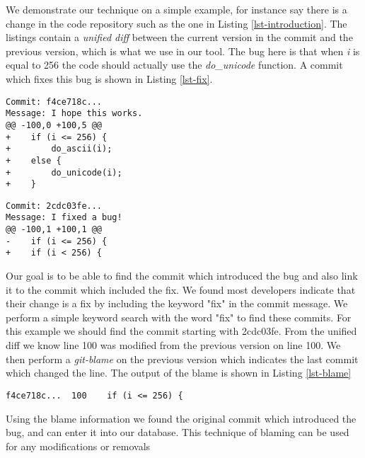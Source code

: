 


We demonstrate our technique on a simple example, for instance say
there is a change in the code repository such as the one in Listing
\ref{lst-introduction}. The listings contain a {\em unified diff}
between the current version in the commit and the previous version,
which is what we use in our tool. The bug here is that when {\em i} is
equal to 256 the code should actually use the {\em do\_unicode}
function. A commit which fixes this bug is shown in Listing \ref{lst-fix}.


\begin{lstlisting}[caption=An example bug introduction,label=lst-introduction, frame=single]
Commit: f4ce718c...
Message: I hope this works.
@@ -100,0 +100,5 @@
+    if (i <= 256) {
+        do_ascii(i);
+    else {
+        do_unicode(i);
+    }
\end{lstlisting}

\begin{lstlisting}[caption=An example bug fix,label=lst-fix,frame=single]
Commit: 2cdc03fe...
Message: I fixed a bug!
@@ -100,1 +100,1 @@
-    if (i <= 256) {
+    if (i < 256) {
\end{lstlisting}

Our goal is to be able to find the commit which introduced the bug and
also link it to the commit which included the fix. We found most
developers indicate that their change is a fix by including the keyword "fix"
in the commit message. We perform a simple keyword search with the word "fix"
to find these commits. For this example we should find the commit
starting with 2cdc03fe. From the unified diff we know line 100 was
modified from the previous version on line 100. We then perform a {\em
  git-blame} on the previous version which indicates the last commit
which changed the line. The output of the blame is shown in Listing
\ref{lst-blame}

\begin{lstlisting}[caption=Blame of the previous version,label=lst-blame,frame=single]
f4ce718c...  100    if (i <= 256) {
\end{lstlisting}

Using the blame information we found the original commit which
introduced the bug, and can enter it into our database. This
technique of blaming can be used for any modifications or removals

